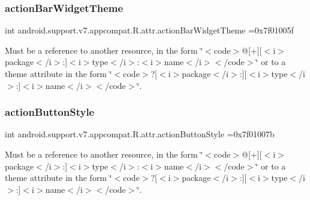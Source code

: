 \subsubsection{\texorpdfstring{action\+Bar\+Widget\+Theme}{actionBarWidgetTheme}}
{\footnotesize\ttfamily int android.\+support.\+v7.\+appcompat.\+R.\+attr.\+action\+Bar\+Widget\+Theme =0x7f01005f\hspace{0.3cm}{\ttfamily [static]}}

Must be a reference to another resource, in the form \char`\"{}$<$code$>$@\mbox{[}+\mbox{]}\mbox{[}$<$i$>$package$<$/i$>$\+:\mbox{]}$<$i$>$type$<$/i$>$\+:$<$i$>$name$<$/i$>$$<$/code$>$\char`\"{} or to a theme attribute in the form \char`\"{}$<$code$>$?\mbox{[}$<$i$>$package$<$/i$>$\+:\mbox{]}\mbox{[}$<$i$>$type$<$/i$>$\+:\mbox{]}$<$i$>$name$<$/i$>$$<$/code$>$\char`\"{}. \mbox{\label{classandroid_1_1support_1_1v7_1_1appcompat_1_1R_1_1attr_a3a9c65c5f489ade11715a890bcb6817d}} 
\subsubsection{\texorpdfstring{action\+Button\+Style}{actionButtonStyle}}
{\footnotesize\ttfamily int android.\+support.\+v7.\+appcompat.\+R.\+attr.\+action\+Button\+Style =0x7f01007b\hspace{0.3cm}{\ttfamily [static]}}

Must be a reference to another resource, in the form \char`\"{}$<$code$>$@\mbox{[}+\mbox{]}\mbox{[}$<$i$>$package$<$/i$>$\+:\mbox{]}$<$i$>$type$<$/i$>$\+:$<$i$>$name$<$/i$>$$<$/code$>$\char`\"{} or to a theme attribute in the form \char`\"{}$<$code$>$?\mbox{[}$<$i$>$package$<$/i$>$\+:\mbox{]}\mbox{[}$<$i$>$type$<$/i$>$\+:\mbox{]}$<$i$>$name$<$/i$>$$<$/code$>$\char`\"{}. \mbox{\label{classandroid_1_1support_1_1v7_1_1appcompat_1_1R_1_1attr_ad8381a94ffd2505e02cb8ebd52e55328}} 
